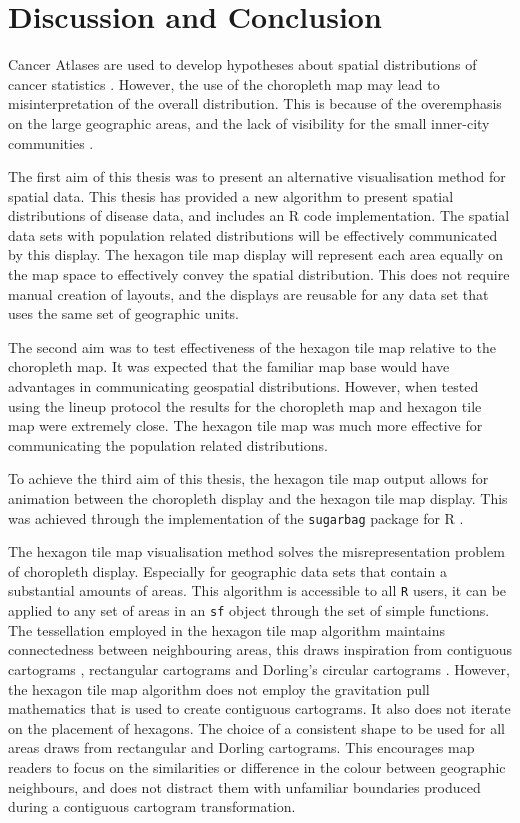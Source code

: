 \documentclass{monashthesis}
\begin{document}
\hypertarget{ch:conclusion}{%
\chapter{Discussion and Conclusion}\label{ch:conclusion}}

Cancer Atlases are used to develop hypotheses about spatial distributions of cancer statistics \autocite{CPISACA}. However, the use of the choropleth map may lead to misinterpretation of the overall distribution. This is because of the overemphasis on the large geographic areas, and the lack of visibility for the small inner-city communities \autocite{ACTUC}.

The first aim of this thesis was to present an alternative visualisation method for spatial data. This thesis has provided a new algorithm to present spatial distributions of disease data, and includes an R code \autocite{R} implementation. The spatial data sets with population related distributions will be effectively communicated by this display. The hexagon tile map display will represent each area equally on the map space to effectively convey the spatial distribution. This does not require manual creation of layouts, and the displays are reusable for any data set that uses the same set of geographic units.

The second aim was to test effectiveness of the hexagon tile map relative to the choropleth map. It was expected that the familiar map base would have advantages in communicating geospatial distributions. However, when tested using the lineup protocol the results for the choropleth map and hexagon tile map were extremely close. The hexagon tile map was much more effective for communicating the population related distributions.

To achieve the third aim of this thesis, the hexagon tile map output allows for animation between the choropleth display and the hexagon tile map display. This was achieved through the implementation of the \texttt{sugarbag} \autocite{sugarbag} package for R \autocite{R}.

The hexagon tile map visualisation method solves the misrepresentation problem of choropleth display. Especially for geographic data sets that contain a substantial amounts of areas. This algorithm is accessible to all \texttt{R} users, it can be applied to any set of areas in an \texttt{sf} \autocite{sf} object through the set of simple functions.
The tessellation employed in the hexagon tile map algorithm maintains connectedness between neighbouring areas, this draws inspiration from contiguous cartograms \autocite{ACA}, rectangular cartograms \autocite{RSCW} and Dorling's circular cartograms \autocite{ACTUC}. However, the hexagon tile map algorithm does not employ the gravitation pull mathematics that is used to create contiguous cartograms. It also does not iterate on the placement of hexagons. The choice of a consistent shape to be used for all areas draws from rectangular and Dorling cartograms. This encourages map readers to focus on the similarities or difference in the colour between geographic neighbours, and does not distract them with unfamiliar boundaries produced during a contiguous cartogram transformation.
\end{document}
